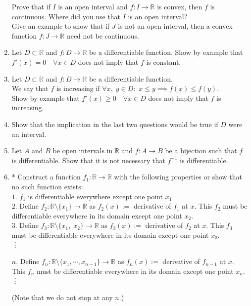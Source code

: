 \documentclass{article}
\begin{document}
\begin{enumerate}
	Prove that if $I$ is an open interval and $f:I\to\mathbb{R}$ is convex, then $f$ is continuous. Where did you use that $I$ is an open interval?\\
	Give an example to show that if $J$ is not an open interval, then a convex function $f:J\to\mathbb{R}$ need not be continuous.
	\item Let $D \subset \mathbb{R}$ and $f:D\to\mathbb{R}$ be a differentiable function. Show by example that $f'(x) = 0 \quad \forall x \in D$ does not imply that $f$ is constant.
	\item Let $D \subset \mathbb{R}$ and $f:D\to\mathbb{R}$ be a differentiable function.\\
	We say that $f$ is increasing if $\forall x,\;y \in D:$ $x \le y \implies f(x) \le f(y).$\\
	Show by example that $f'(x) \ge 0 \quad \forall x\in D$ does not imply that $f$ is increasing.
	\item Show that the implication in the last two questions would be true if $D$ were an interval.
	\item Let $A$ and $B$ be open intervals in $\mathbb{R}$ and $f:A\to B$ be a bijection such that $f$ is differentiable. Show that it is not necessary that $f^{-1}$ is differentiable.
	\item * Construct a function $f_1:\mathbb{R}\to\mathbb{R}$ with the following properties or show that no such function exists:\\
	$1.$ $f_1$ is differentiable everywhere except one point $x_1.$\\
	$2.$ Define $f_2 : \mathbb{R}\setminus\{x_1\} \to \mathbb{R}$ as $f_2(x) := $ derivative of $f_1$ at $x.$ This $f_2$ must be differentiable everywhere in its domain except one point $x_2.$\\
	$3.$ Define $f_3 : \mathbb{R}\setminus\{x_1,\;x_2\} \to \mathbb{R}$ as $f_3(x) := $ derivative of $f_2$ at $x.$ This $f_3$ must be differentiable everywhere in its domain except one point $x_3.$\\
	\vdots

	$n.$ Define $f_n : \mathbb{R}\setminus\{x_1, \cdots, x_{n-1}\} \to \mathbb{R}$ as $f_n(x) := $ derivative of $f_{n-1}$ at $x.$ This $f_n$ must be differentiable everywhere in its domain except one point $x_n.$\\
	\vdots

	(Note that we do not stop at any $n.$) 
\end{enumerate}
\end{document}
